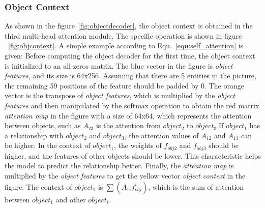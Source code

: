 \subsubsection{Object Context}

As shown in the figure~\ref{fig:objectdecoder}, the object context is obtained in the third multi-head attention module. The specific operation is shown in figure ~\ref{fig:objcontext}. A simple example according to Equ.~\ref{equ:self_attention} is given: Before computing the object decoder for the first time, the object context is initialized to an all-zeros matrix. The blue vector in the figure is \textit{object features}, and its size is 64x256. Assuming that there are 5 entities in the picture, the remaining 59 positions of the feature should be padded by 0. The orange vector is the transpose of \textit{object features}, which is multiplied by the \textit{object features} and then manipulated by the softmax operation to obtain the red matrix \textit{attention map} in the figure with a size of 64x64, which represents the attention between objects, such as $A_{23}$ is the attention from $object_2$ to $object_3$.If $ object_1 $ has a relationship with $ object_2 $ and $ object_3 $, the attention values of  $A_{12}$  and  $A_{13}$  can be higher. In the context of $ object_1 $, the weights of $ f_{obj2}$ and $ f_{obj3} $  should be higher, and the features of other objects should be lower. This characteristic helps the model to predict the relationship better.
Finally, the \textit{attention map} is multiplied by the \textit{object features} to get the yellow vector \textit{object context} in the figure. The context of $object_1$ is $\sum(A_{1i}f_{obj}^i)$, which is the sum of attention between $object_1$ and other $object_i$.

%


